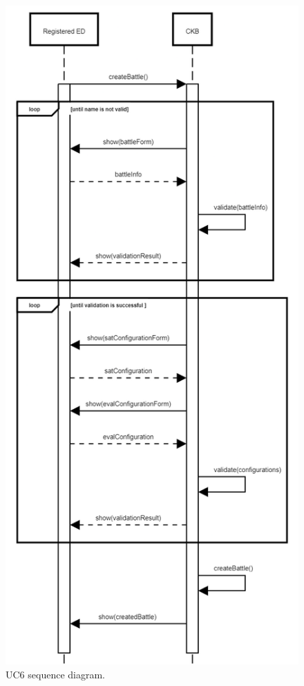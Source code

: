\begin{center}
  \begin{figure} [H]
    \begin{center}
        \includegraphics[width=\textwidth,height=\textheight,keepaspectratio]{Images/SequenceDiagrams/UC6_new.png}
        \caption{UC6 sequence diagram.}
        \label{fig: UC6_sequence_diagram}
    \end{center}
  \end{figure}
\end{center}


